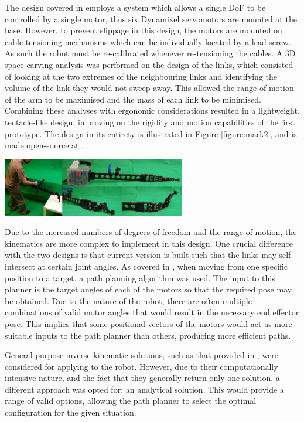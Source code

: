 \documentclass[11pt]{article}
\begin{document}
The design covered in \cite{GreggSmithKinematics} employs a system which allows a single DoF to be controlled by a single motor, thus six Dynamixel servomotors are mounted at the base. However, to prevent slippage in this design, the motors are mounted on cable tensioning mechanisms which can be individually located by a lead screw. As such the robot must be re-calibrated whenever re-tensioning the cables. A 3D space carving analysis was performed on the design of the links, which consisted of looking at the two extremes of the neighbouring links and identifying the volume of the link they would not sweep away. This allowed the range of motion of the arm to be maximised and the mass of each link to be minimised. Combining these analyses with ergonomic considerations resulted in a lightweight, tentacle-like design, improving on the rigidity and motion capabilities of the first prototype. The design in its entirety is illustrated in Figure \ref{figure:mark2}, and is made open-source at \cite{handheldrobotics}.

\begin{center}
\includegraphics[width = 0.6\textwidth]{mark2.png}
\label{figure:mark2}
\end{center}

Due to the increased numbers of degrees of freedom and the range of motion, the kinematics are more complex to implement in this design. One crucial difference with the two designs is that current version is built such that the links may self-intersect at certain joint angles. As covered in \cite{GreggSmithKinematics}, when moving from one specific position to a target, a path planning algorithm was used. The input to this planner is the target angles of each of the motors so that the required pose may be obtained. Due to the nature of the robot, there are often multiple combinations of valid motor angles that would result in the necessary end effector pose. This implies that some positional vectors of the motors would act as more suitable inputs to the path planner than others, producing more efficient paths.

General purpose inverse kinematic solutions, such as that provided in \cite{Aristidou2011}, were considered for applying to the robot. However, due to their computationally intensive nature, and the fact that they generally return only one solution, a different approach was opted for; an analytical solution. This would provide a range of valid options, allowing the path planner to select the optimal configuration for the given situation. 
\end{document}
